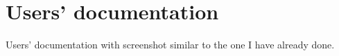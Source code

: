 \chapter{Users' documentation}
Users' documentation with screenshot similar to the one I have already done.